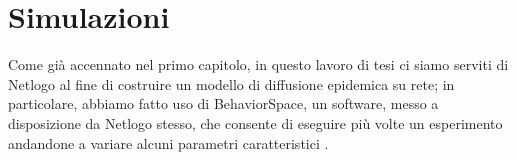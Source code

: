 \chapter{Simulazioni}
\label{chap:cap4}
Come già accennato nel primo capitolo, in questo lavoro di tesi ci siamo serviti di Netlogo al fine di costruire un modello di diffusione epidemica su rete; in particolare, abbiamo fatto uso di BehaviorSpace, un software, messo a disposizione da Netlogo stesso, che consente di eseguire più volte un esperimento andandone a variare alcuni parametri caratteristici \cite{Wilensky2}.
	
	
	